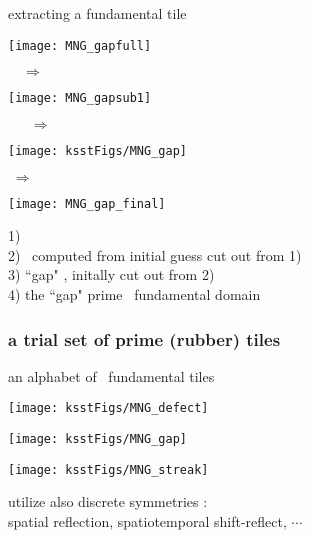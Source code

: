 \begin{frame}{extracting a fundamental tile}
\begin{minipage}[height=.60\textheight]{.24\textheight}
\centering %
\texttt{[image: MNG\_gapfull]}
\end{minipage}
    $\quad\Rightarrow\;$
\begin{minipage}[height=.60\textheight]{.24\textheight}
\centering %
\texttt{[image: MNG\_gapsub1]}
\end{minipage}
    $\quad\;\;\Rightarrow\;$
\begin{minipage}[height=.60\textheight]{.18\textheight}
\centering             %
\texttt{[image: ksstFigs/MNG\_gap]}
\end{minipage}
    $\;\Rightarrow\;$
\begin{minipage}[height=.60\textheight]{.12\textheight}
\centering %
\texttt{[image: MNG\_gap\_final]}
\end{minipage}

1) \twot\ %
    \\
2) \twot\ computed from initial guess cut out from 1)
    \\
3) ``gap" \twot, %
     initally cut out from 2)
     \\
4) the ``gap"  prime  \twot\ fundamental domain
\end{frame}

\begin{frame}%
  \frametitle{a trial set of prime (rubber) tiles}
  \begin{block} {an alphabet of \KS\ fundamental tiles}
\begin{minipage}[height=.60\textheight]{.25\textheight}
\centering             %
\texttt{[image: ksstFigs/MNG\_defect]}
\end{minipage} \qquad
\begin{minipage}[height=.60\textheight]{.25\textheight}
\centering     %
\texttt{[image: ksstFigs/MNG\_gap]}
\end{minipage} \qquad
\begin{minipage}[height=.60\textheight]{.25\textheight}
\centering             %
\texttt{[image: ksstFigs/MNG\_streak]}
\end{minipage}
  \end{block}
\vfill
utilize also discrete symmetries : \\
spatial reflection, spatiotemporal shift-reflect,
$\cdots$
\end{frame}


